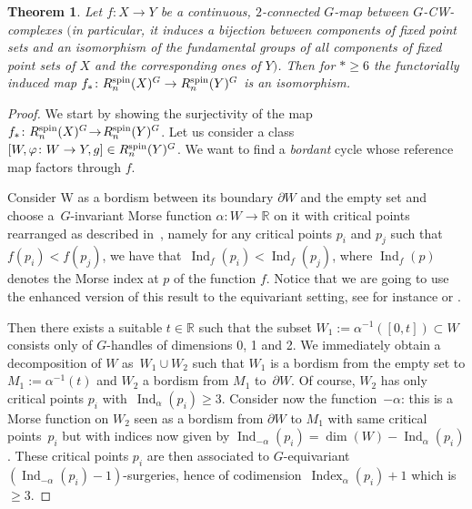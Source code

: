 \documentclass[pdftex]{sigma}
\numberwithin{equation}{section}
\newtheorem{Theorem}{Theorem}[section]
\def\RR{\ensuremath{\mathbb{R}}}
\begin{document}
	\begin{Theorem}\label{G2conn}
		Let $f\colon X \rightarrow Y$ be a continuous, $2$-connected $G$-map
		between $G$-CW-complexes $($in particular, it induces a bijection
		between components of fixed point sets and an isomorphism of the
		fundamental groups of all
		components of fixed point sets of $X$ and the corresponding ones of
		$Y)$. Then for $*\ge 6$ the
		functorially induced map
$f_{*}\colon R_{n}^{\rm spin}(X)^{G} \rightarrow R_{n}^{\rm spin}(Y)^{G}
$
		is an isomorphism.
	\end{Theorem}
	\begin{proof}
\! We start by showing the surjectivity of the map
$f_{*}\colon R_{n}^{\rm spin}(X)^{G} \!\rightarrow\! R_{n}^{\rm spin}(Y)^{G}$.
		Let us consider a class $[W,\varphi\colon W \rightarrow Y, g] \in
		R_{n}^{\rm spin}(Y)^{G}$. We want to find a \textit{bordant} cycle whose reference map factors through $f$.
		
Consider W as a bordism between its boundary $\partial W$ and the empty set
		and choose a~$G$-invariant Morse function $\alpha\colon W\to \RR$ on it with
		critical points rearranged as described in~\cite[Theorem 4.8]{Milnor}, namely
		for any critical points $p_{i}$ and $p_{j}$ such that $f(p_{i}) < f(p_{j})$,
		we have that~${\operatorname{Ind}_f(p_{i}) < \operatorname{Ind}_f(p_{j})}$, where $\operatorname{Ind}_f(p)$ denotes the Morse index at $p$ of the function $f$. Notice that we are going to use the
		enhanced version of this result to the equivariant setting, see for instance
		\cite{Mayer} or \cite{Wasserman}.
		
		Then there exists a suitable $t\in \RR$ such that the subset $W_1:=\alpha^{-1}([0,t])\subset W$ consists only of $G$-handles of dimensions 0, 1 and 2. We immediately obtain a decomposition of $W$ as~${W_{1} \cup W_{2}}$ such that $W_{1}$ is a bordism from the empty set to $M_{1}:=\alpha^{-1}(t)$ and $W_{2}$ a bordism from $M_{1}$ to~$\partial W$.
		Of course, $W_{2}$ has only critical points $p_{i}$ with~$\operatorname{Ind}_{\alpha}(p_{i}) \geq 3$. Consider now the function~$-\alpha$: this is a Morse function on $W_{2}$ seen as a bordism from $\partial W$ to $M_{1}$ with same critical points~$p_{i}$ but with indices now given by $\operatorname{Ind}_{-\alpha}(p_{i})=\dim(W)-\operatorname{Ind}_{\alpha}(p_{i})$. These critical points $p_{i}$ are then associated to $G$-equivariant~${(\operatorname{Ind}_{-\alpha}(p_{i})-1)}$-surgeries, hence of codimension~${\operatorname{Index}_{\alpha}(p_{i})+1}$ which is $\geq 3$.
		

\end{proof}
\end{document}
